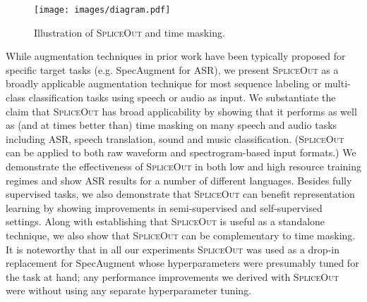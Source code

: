 \documentclass{article}
\newcommand{\SpA}{{\textsc{SpliceOut}}\xspace}
\begin{document}
\begin{figure}[t!]
    \centering
    \texttt{[image: images/diagram.pdf]}
    \caption{Illustration of \SpA and time masking.} 
    \label{fig:spliceout}
\end{figure}


While augmentation techniques in prior work have been typically proposed for specific target tasks (e.g. SpecAugment for ASR), we present \SpA as a broadly applicable augmentation technique for most sequence labeling or multi-class classification tasks using speech or audio as input. We substantiate the claim that \SpA has broad applicability by showing that it performs as well as (and at times better than) time masking on many speech and audio tasks including ASR, speech translation, sound and music classification. (\SpA can be applied to both raw waveform and spectrogram-based input formats.) 
We demonstrate the effectiveness of \SpA in both low and high resource training regimes and show ASR results for a number of different languages. Besides fully supervised tasks, we also demonstrate that \SpA can benefit representation learning by showing improvements in semi-supervised and self-supervised settings. Along with establishing that \SpA is useful as a standalone technique, we also show that \SpA can be complementary to time masking. It is noteworthy that in all our experiments \SpA was used as a drop-in replacement for SpecAugment whose hyperparameters were presumably tuned for the task at hand; any performance improvements we derived with \SpA were  without using any separate hyperparameter tuning. 

\end{document}
